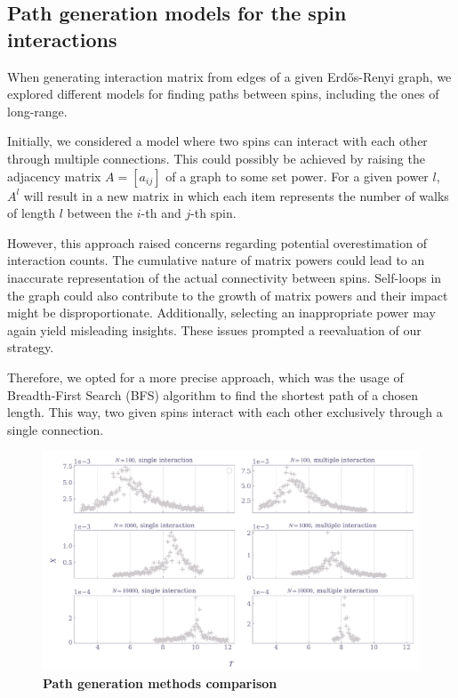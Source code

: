 \documentclass[11pt,a4paper]{article}
\begin{document}
\subsection{Path generation models for the spin interactions}

When generating interaction matrix from edges of a given Erdős-Renyi graph, we explored different models for finding paths between spins, including the ones of long-range.

Initially, we considered a model where two spins can interact with each other through multiple connections. This could possibly be achieved by raising the adjacency matrix $A=[a_{ij}]$ of a graph to some set power. For a given power $l$, $A^l$ will result in a new matrix in which each item represents the number of walks of length $l$ between the $i$-th and $j$-th spin.

However, this approach raised concerns regarding potential overestimation of interaction counts. The cumulative nature of matrix powers could lead to an inaccurate representation of the actual connectivity between spins. Self-loops in the graph could also contribute to the growth of matrix powers and their impact might be disproportionate. Additionally, selecting an inappropriate power may again yield misleading insights. These issues prompted a reevaluation of our strategy.

Therefore, we opted for a more precise approach, which was the usage of Breadth-First Search (BFS) algorithm to find the shortest path of a chosen length. This way, two given spins interact with each other exclusively through a single connection.

\begin{figure}[ht!]
    \centering
    \caption{\textbf{Path generation methods comparison}}
    \includegraphics[width=\linewidth]{../figures/single_vs_multiple.pdf}
\end{figure}
\pagebreak
\end{document}
